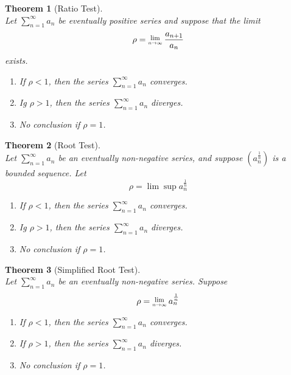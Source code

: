 \documentclass[8pt]{article}
\newcommand{\Lim}[1]{\raisebox{0.5ex}{\scalebox{0.8}{$\displaystyle \lim_{#1}\;$}}}
\newtheorem{theorem}{Theorem}[section]
\theoremstyle{definition}
\begin{document}
\begin{theorem}[Ratio Test]
\hfill\\\normalfont Let $\sum_{n=1}^\infty a_n$ be eventually positive series and suppose that the limit
\[
\rho = \Lim{n\to\infty}\frac{a_{n+1}}{a_n}
\]
exists.
\begin{enumerate}
\item If $\rho<1$, then the series $\sum_{n=1}^\infty a_n$ converges.
\item Ig $\rho>1$, then the series $\sum_{n=1}^\infty a_n$ diverges.
\item No conclusion if $\rho = 1$.
\end{enumerate}
\end{theorem}
\begin{theorem}[Root Test]
\hfill\\\normalfont Let $\sum_{n=1}^\infty a_n$ be an eventually non-negative series, and suppose $(a_n^{\frac{1}{n}})$ is a bounded sequence. Let
\[
\rho = \lim\sup a_n^{\frac{1}{n}}
\]
\begin{enumerate}
\item If $\rho<1$, then the series $\sum_{n=1}^\infty a_n$ converges.
\item Ig $\rho>1$, then the series $\sum_{n=1}^\infty a_n$ diverges.
\item No conclusion if $\rho = 1$.
\end{enumerate}
\end{theorem}
\begin{theorem}[Simplified Root Test]
\hfill\\\normalfont Let $\sum_{n=1}^\infty a_n$ be an eventually non-negative series. Suppose
\[
\rho = \Lim{n\to\infty} a_n^{\frac{1}{n}}
\]
\begin{enumerate}
\item If $\rho<1$, then the series $\sum_{n=1}^\infty a_n$ converges.
\item If $\rho>1$, then the series $\sum_{n=1}^\infty a_n$ diverges.
\item No conclusion if $\rho = 1$.
\end{enumerate}
\end{theorem}
\end{document}
